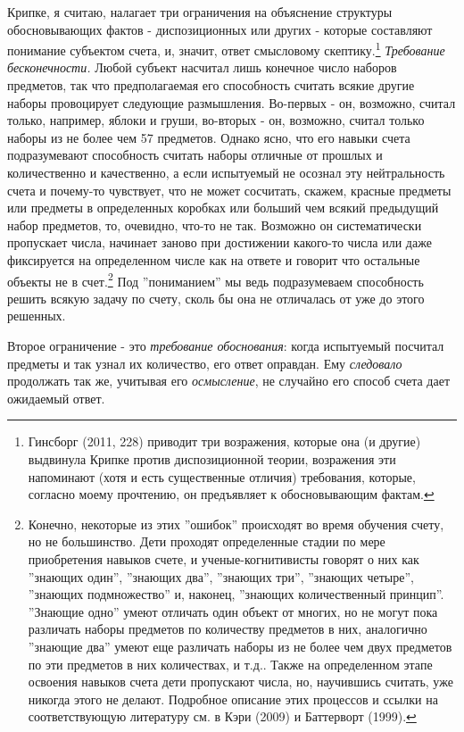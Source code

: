 \documentclass[12pt]{book}
\begin{document}
Крипке, я считаю, налагает три ограничения на объяснение структуры обосновывающих фактов - диспозиционных или других - которые составляют понимание субъектом счета, и, значит, ответ смысловому скептику.\footnote{Гинсборг (2011, 228) приводит три возражения, которые она (и другие) выдвинула Крипке против диспозиционной теории, возражения эти напоминают (хотя и есть существенные отличия) требования, которые, согласно моему прочтению, он предъявляет к обосновывающим фактам.} \textit{Требование бесконечности.} Любой субъект насчитал лишь конечное число наборов предметов, так что предполагаемая его способность считать всякие другие наборы провоцирует следующие размышления. Во-первых - он, возможно, считал только, например, яблоки и груши, во-вторых - он, возможно, считал только наборы из не более чем 57 предметов. Однако ясно, что его навыки счета подразумевают способность считать наборы отличные от прошлых и количественно и качественно, а если испытуемый не осознал эту нейтральность счета и почему-то чувствует, что не может сосчитать, скажем, красные предметы или предметы в определенных коробках или больший чем всякий предыдущий набор предметов, то, очевидно, что-то не так. Возможно он систематически пропускает числа, начинает заново при достижении какого-то числа или даже фиксируется на определенном числе как на ответе и говорит что остальные объекты не в счет.\footnote{Конечно, некоторые из этих ''ошибок'' происходят во время обучения счету, но не большинство. Дети проходят определенные стадии по мере приобретения навыков счете, и ученые-когнитивисты говорят о них как ''знающих один'', ''знающих два'', ''знающих три'', ''знающих четыре'', ''знающих подмножество'' и, наконец, ''знающих количественный принцип''. ''Знающие одно'' умеют отличать один объект от многих, но не могут пока различать наборы предметов по количеству предметов в них, аналогично ''знающие два'' умеют еще различать наборы из не более чем двух предметов по эти предметов в них количествах, и т.д.. Также на определенном этапе освоения навыков счета дети пропускают числа, но, научившись считать, уже никогда этого не делают. Подробное описание этих процессов и ссылки на соответствующую литературу см. в Кэри (2009) и Баттерворт (1999).} Под ''пониманием'' мы ведь подразумеваем способность решить всякую задачу по счету, сколь бы она не отличалась от уже до этого решенных.

Второе ограничение - это \textit{требование обоснования}: когда испытуемый посчитал предметы и так узнал их количество, его ответ оправдан. Ему \textit{следовало} продолжать так же, учитывая его \textit{осмысление}, не случайно его способ счета дает ожидаемый ответ.
\end{document}
